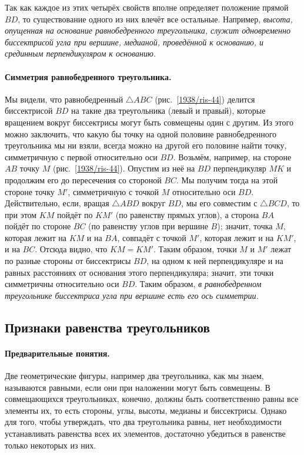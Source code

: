 Так как каждое из этих четырёх свойств вполне определяет положение прямой $BD$, то существование одного из них влечёт все остальные.
Например, \emph{высота, опущенная на основание равнобедренного треугольника, служит одновременно биссектрисой угла при вершине, медианой, проведённой к основанию, и срединным перпендикуляром к основанию.} 

\paragraph{Симметрия равнобедренного треугольника.}\label{1938/40}
Мы видели, что равнобедренный $\triangle ABC$ (рис.~\ref{1938/ris-44}) делится биссектрисой $BD$ на такие два треугольника (левый и правый), которые вращением вокруг биссектрисы могут быть совмещены один с другим.
Из этого можно заключить, что какую бы точку на одной половине равнобедренного треугольника мы ни взяли, всегда можно на другой его половине найти точку, симметричную с первой относительно оси $BD$.
Возьмём, например, на стороне $AB$ точку $M$ (рис.~\ref{1938/ris-44}).
Опустим из неё на $BD$ перпендикуляр $MK$ и продолжим его до пересечения со стороной $BC$.
Мы получим тогда на этой стороне точку $M'$, симметричную с точкой $M$ относительно оси $BD$.
Действительно, если, вращая $\triangle ABD$ вокруг $BD$, мы его совместим с $\triangle BCD$, то при этом $KM$ пойдёт по $KM'$ (по равенству прямых углов), а сторона $BA$ пойдёт по стороне $BC$ (по равенству углов при вершине $B$);
значит, точка $M$, которая лежит на $KM$ и на $BA$, совпадёт с точкой $M'$, которая лежит и на $KM'$, и на $BC$.
Отсюда видно, что $KM=KM'$.
Таким образом, точки $M$ и $M'$ лежат по разные стороны от биссектрисы $BD$, на одном к ней перпендикуляре и на равных расстояниях от основания этого перпендикуляра;
значит, эти точки симметричны относительно оси $BD$.
Таким образом, \emph{в равнобедренном треугольнике биссектриса угла при вершине есть его ось симметрии.}


\subsection*{Признаки равенства треугольников}

\paragraph{Предварительные понятия.}\label{1938/41}
Две геометрические фигуры, например два треугольника, как мы знаем, называются равными, если они при наложении могут быть совмещены.
В совмещающихся треугольниках, конечно, должны быть соответственно равны все элементы их, то есть стороны, углы, высоты, медианы и биссектрисы.
Однако для того, чтобы утверждать, что два треугольника равны, нет необходимости устанавливать равенства всех их элементов, достаточно убедиться в равенстве только некоторых из них.


